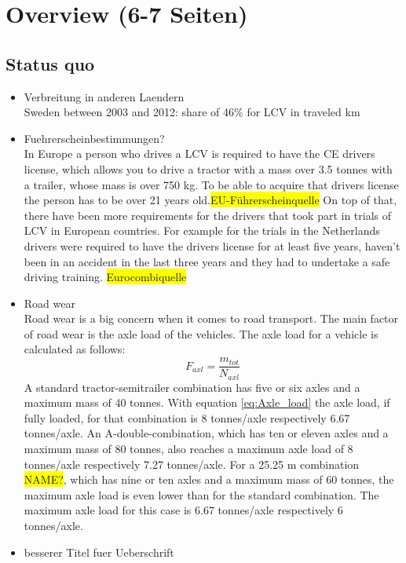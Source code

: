 \documentclass[ExampleMasters.tex]{subfiles}
\begin{document}
\clearpage
\chapter{Overview (6-7 Seiten)}
\label{chap:overview}


\section{Status quo}
\label{sec:legal_situation}

\begin{itemize}
	\item Verbreitung in anderen Laendern \\
	Sweden between 2003 and 2012: share of 46\% for LCV in traveled km \cite{balint2013correlation} 	
	\item Fuehrerscheinbestimmungen? \\
	In Europe a person who drives a LCV is required to have the CE drivers license, which allows you to drive a tractor with a  mass over 3.5 tonnes with a trailer, whose mass is over 750 kg. To be able to acquire that drivers license the person has to be over 21 years old.\colorbox{yellow}{EU-Führerscheinquelle}
	On top of that, there have been more requirements for the drivers that took part in trials of LCV in European countries. For example for the trials in the Netherlands drivers were required to have the drivers license for at least five years, haven't been in an accident in the last three years and they had to undertake a safe driving training. \colorbox{yellow}{Eurocombiquelle}     
	\item Road wear\\
	Road wear is a big concern when it comes to road transport. The main factor of road wear is the axle load of the vehicles.
	The axle load for a vehicle is calculated as follows:\\
	\begin{equation}
	F_{axl}=\frac{m_{tot}}{N_{axl}}
	\label{eq:Axle_load}
	\end{equation}
	A standard tractor-semitrailer combination has five or six axles and a maximum mass of 40 tonnes.
	With equation \eqref{eq:Axle_load} the axle load, if fully loaded, for that combination is 8 tonnes/axle respectively 6.67 tonnes/axle.
	An A-double-combination, which has ten or eleven axles and a maximum mass of 80 tonnes, also reaches a maximum axle  load of 8 tonnes/axle respectively 7.27 tonnes/axle.
	For a 25.25 m combination \colorbox{yellow}{NAME?}, which has nine or ten axles and a maximum mass of 60 tonnes, the maximum axle load is even lower than for the standard combination. The maximum axle load for this case is 6.67 tonnes/axle respectively 6 tonnes/axle. 
	\item besserer Titel fuer Ueberschrift
\end{itemize}
\end{document}
